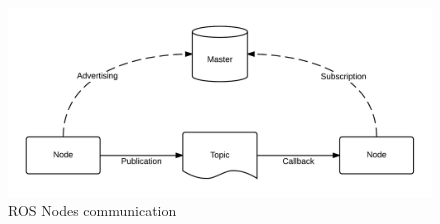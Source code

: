 \begin{figure}[ht]
    \centering
    \includegraphics[width=1\textwidth]{figures/A1/ROS-master-node-topic.png}
    \caption{ROS Nodes communication}
    \label{fig:ROS-architecture}
\end{figure}
